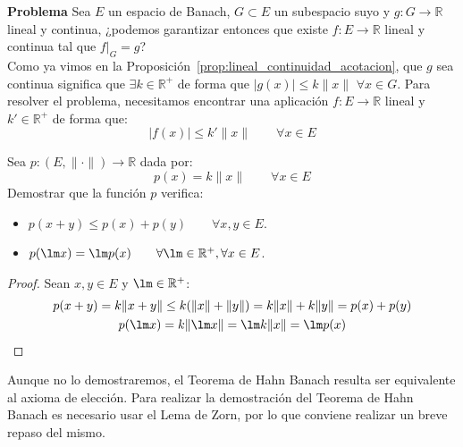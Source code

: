\noindent
\textbf{Problema}\newline
Sea $E$ un espacio de Banach, $G\subset E$ un subespacio suyo y $g:G\to \mathbb{R}$ lineal y continua, ¿podemos garantizar entonces que existe $f:E\to \mathbb{R}$ lineal y continua tal que $f\big|_G = g$?\\

\noindent
Como ya vimos en la Proposición~\ref{prop:lineal_continuidad_acotacion}, que $g$ sea continua significa que $\exists k\in \mathbb{R}^+$ de forma que $|g(x)| \leq k\|x\|$ $\forall x\in G$. Para resolver el problema, necesitamos encontrar una aplicación $f:E\to \mathbb{R}$ lineal y $k'\in \mathbb{R}^+$ de forma que:
\begin{equation*}
    |f(x)| \leq k'\|x\| \qquad \forall x\in E
\end{equation*}

\begin{ejercicio}\label{ej:aplicacion_p}
    Sea $p:(E,\|\cdot \|)\to \mathbb{R}$ dada por:
    \begin{equation*}
        p(x) = k\|x\| \qquad \forall x\in E
    \end{equation*}
    Demostrar que la función $p$ verifica:
    \begin{itemize}
        \item $p(x+y) \leq p(x) + p(y) \qquad \forall x,y\in E$.
        \item $p(\lm x) = \lm p(x) \qquad \forall \lm \in \mathbb{R}^+, \forall x\in E$.
    \end{itemize}
    \begin{proof}
        Sean $x,y\in  E$ y $\lm\in \mathbb{R}^+$:
        \begin{gather*}
            p(x+y)= k\|x+y\| \leq k(\|x\| + \|y\|) = k\|x\| + k\|y\| = p(x) + p(y) \\
            p(\lm x) = k\|\lm x\| = \lm k \|x\| = \lm p(x)
        \end{gather*}
    \end{proof}
\end{ejercicio}

\noindent
Aunque no lo demostraremos, el Teorema de Hahn Banach resulta ser equivalente al axioma de elección. Para realizar la demostración del Teorema de Hahn Banach es necesario usar el Lema de Zorn, por lo que conviene realizar un breve repaso del mismo. 

